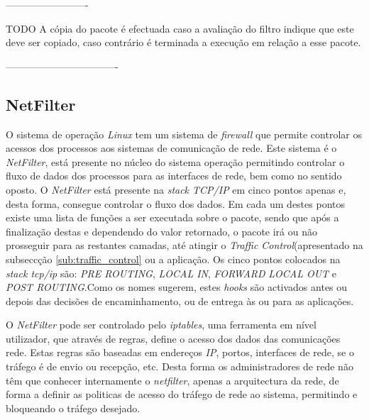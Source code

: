 -------------------------

TODO
A cópia do pacote é efectuada caso a avaliação do filtro indique que este deve ser copiado, caso contrário é terminada a execução em relação a esse pacote.

----------------------------------



\subsection{NetFilter}

O sistema de operação \textit{Linux} tem um sistema de \textit{firewall} que permite controlar os acessos dos processos aos sistemas de comunicação de rede.
Este sistema é o \textit{NetFilter}, está presente no núcleo do sistema operação permitindo controlar o fluxo de dados dos processos para as interfaces de rede, bem como no sentido oposto.
O \textit{NetFilter} está presente na \textit{stack TCP/IP} em cinco pontos apenas e, desta forma, consegue controlar o fluxo dos dados.
Em cada um destes pontos existe uma lista de funções a ser executada sobre o pacote, sendo que após a finalização destas e dependendo do valor retornado, o pacote irá ou não prosseguir para as restantes camadas, até atingir o \textit{Traffic Control}(apresentado na subseccção \ref{sub:traffic_control} ou a aplicação.
Os cinco pontos colocados na \textit{stack tcp/ip} são: \textit{PRE ROUTING}, \textit{LOCAL IN}, \textit{FORWARD} \textit{LOCAL OUT} e \textit{POST ROUTING}.Como os nomes sugerem, estes \textit{hooks} são activados antes ou depois das decisões de encaminhamento, ou de entrega às ou para as aplicações.

O \textit{NetFilter} pode ser controlado pelo \textit{iptables}, uma ferramenta em nível utilizador, que através de regras, define o acesso dos dados das comunicações rede.
Estas regras são baseadas em endereços \textit{IP}, portos, interfaces de rede, se o tráfego é de envio ou recepção, etc.
Desta forma os administradores de rede não têm que conhecer internamente o \textit{netfilter}, apenas a arquitectura da rede, de forma a definir as politicas de acesso do tráfego de rede ao sistema, permitindo e bloqueando o tráfego desejado.

